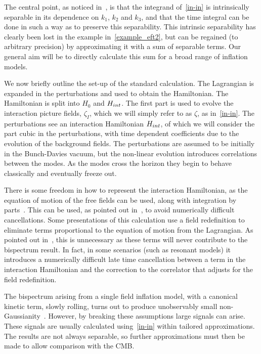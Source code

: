 The central point, as noticed in~\cite{Funakoshi}, is that the
integrand of~\eqref{in-in} is intrinsically separable
in its dependence on $k_1$, $k_2$ and $k_3$, and that the time integral
can be done in such a way as to preserve this separability.
This intrinsic separability has clearly been lost in
the example in~\eqref{example_eft2},
but can be regained (to arbitrary precision) by approximating it
with a sum of separable terms. Our general aim will be to directly calculate
this sum for a broad range of inflation models.

We now briefly outline the set-up of the standard calculation.
The Lagrangian is expanded in the perturbations and used to obtain the Hamiltonian.
The Hamiltonian is split into $H_0$ and $H_{int}$.
The first part is used to evolve the interaction picture fields, $\zeta_I$,
which we will simply refer to as $\zeta$, as in~\eqref{in-in}.
The perturbations see an interaction Hamiltonian $H_{int}$,
of which we will consider the part cubic in the perturbations,
with time dependent coefficients due to the evolution of the background fields.
The perturbations are assumed to be initially in the Bunch-Davies vacuum,
but the non-linear
evolution introduces correlations between the modes.
As the modes cross the horizon they begin to behave classically
and eventually freeze out.


There is some freedom in how to represent the interaction Hamiltonian,
as the equation of motion of the free fields can be used, along with integration by parts~\cite{rp_integ_by_parts}.
This can be used, as pointed out in~\cite{Funakoshi}, to avoid numerically difficult cancellations.
Some presentations of this calculation use a field redefinition to eliminate terms
proportional to the equation of motion from the Lagrangian.
As pointed out in~\cite{px_burrage},
this is unnecessary as these terms will never contribute to the bispectrum result.
In fact, in some scenarios (such as resonant models) it introduces a numerically difficult
late time cancellation between a term in the interaction Hamiltonian and the
correction to the correlator that adjusts for the field redefinition.


The bispectrum arising from a single field inflation model,
with a canonical kinetic term, slowly rolling, turns out to produce
unobservably small non-Gaussianity~\cite{Maldacena}.
However, by breaking these assumptions large signals can arise.
These signals are usually calculated using~\eqref{in-in} within tailored approximations.
The results are not always separable, so further approximations must then be made to
allow comparison with the CMB.
